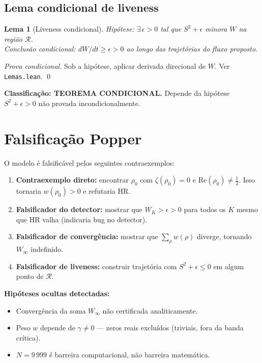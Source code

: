 \documentclass[12pt,a4paper]{article}
\newtheorem{lemma}[theorem]{Lema}
\theoremstyle{definition}
\begin{document}
\subsection{Lema condicional de liveness}

\begin{boxconditional}
\begin{lemma}[Liveness condicional]\label{lem:liveness}
\emph{Hipótese:} $\exists\,\epsilon > 0$ tal que $S^2 + \epsilon$
minora $W$ na região $\mathcal{R}$.\\
\emph{Conclusão condicional:} $dW/dt \ge \epsilon > 0$ ao longo
das trajetórias do fluxo proposto.
\end{lemma}
\begin{proof}[Prova condicional]
Sob a hipótese, aplicar derivada direcional de $W$. Ver \texttt{Lemas.lean}. \qed
\end{proof}
\textbf{Classificação: TEOREMA CONDICIONAL.}
Depende da hipótese $S^2+\epsilon > 0$ não provada incondicionalmente.
\end{boxconditional}

\section{Falsificação Popper}\label{sec:falsificacao}

O modelo é falsificável pelos seguintes contraexemplos:

\begin{enumerate}
  \item \textbf{Contraexemplo direto:} encontrar $\rho_0$ com
        $\zeta(\rho_0) = 0$ e $\mathrm{Re}(\rho_0) \ne \tfrac{1}{2}$.
        Isso tornaria $w(\rho_0) > 0$ e refutaria HR.
  \item \textbf{Falsificador do detector:} mostrar que
        $W_K > \epsilon > 0$ para todos os $K$ mesmo que HR valha
        (indicaria bug no detector).
  \item \textbf{Falsificador de convergência:} mostrar que
        $\sum_\rho w(\rho)$ diverge, tornando $W_\infty$ indefinido.
  \item \textbf{Falsificador de liveness:} construir trajetória
        com $S^2 + \epsilon \le 0$ em algum ponto de $\mathcal{R}$.
\end{enumerate}

\textbf{Hipóteses ocultas detectadas:}
\begin{itemize}
  \item Convergência da soma $W_\infty$ não certificada analiticamente.
  \item Peso $w$ depende de $\gamma \ne 0$ --- zeros reais excluídos
        (triviais, fora da banda crítica).
  \item $N = 9\,999$ é barreira computacional, não barreira matemática.
\end{itemize}
\end{document}
